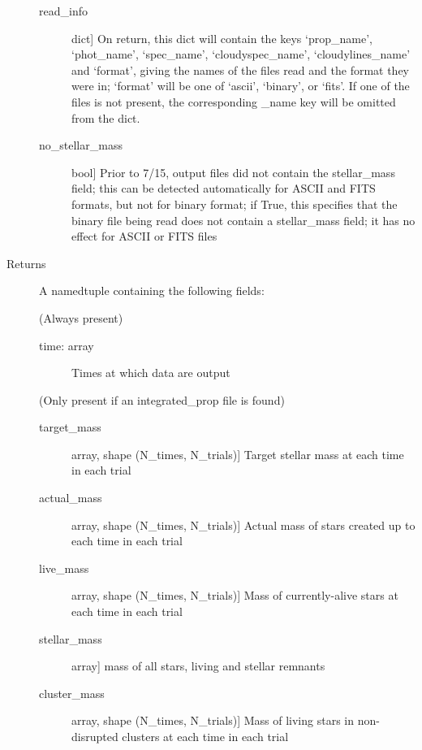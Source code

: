 \documentclass[letterpaper,10pt,english]{sphinxmanual}
\begin{document}
\begin{fulllineitems}
\begin{description}
\begin{description}
\item[{read\_info}] \leavevmode{[}dict{]}
On return, this dict will contain the keys `prop\_name',
`phot\_name', `spec\_name', `cloudyspec\_name', `cloudylines\_name'
and `format', giving the names of the files read and the format
they were in; `format' will be one of `ascii', `binary', or
`fits'. If one of the files is not present, the corresponding
\_name key will be omitted from the dict.

\item[{no\_stellar\_mass}] \leavevmode{[}bool{]}
Prior to 7/15, output files did not contain the stellar\_mass
field; this can be detected automatically for ASCII and FITS
formats, but not for binary format; if True, this specifies
that the binary file being read does not contain a
stellar\_mass field; it has no effect for ASCII or FITS files

\end{description}

\item[{Returns}] \leavevmode
A namedtuple containing the following fields:

(Always present)
\begin{description}
\item[{time: array}] \leavevmode
Times at which data are output

\end{description}

(Only present if an integrated\_prop file is found)
\begin{description}
\item[{target\_mass}] \leavevmode{[}array, shape (N\_times, N\_trials){]}
Target stellar mass at each time in each trial

\item[{actual\_mass}] \leavevmode{[}array, shape (N\_times, N\_trials){]}
Actual mass of stars created up to each time in each trial

\item[{live\_mass}] \leavevmode{[}array, shape (N\_times, N\_trials){]}
Mass of currently-alive stars at each time in each trial

\item[{stellar\_mass}] \leavevmode{[}array{]}
mass of all stars, living and stellar remnants

\item[{cluster\_mass}] \leavevmode{[}array, shape (N\_times, N\_trials){]}
Mass of living stars in non-disrupted clusters at each time in
each trial


\end{description}
\end{description}
\end{fulllineitems}
\end{document}

